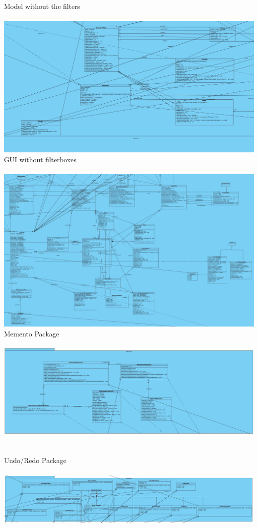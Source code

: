 \documentclass[twoside]{book}
\newcommand{\+}{\discretionary{\mbox{\scriptsize$\hookleftarrow$}}{}{}}
\begin{document}
\newpage
Model without the filters\\\\
{\centering\includegraphics[width=1\textwidth]{Model_noFilter.jpg}}\\
\newpage
GUI without filterboxes\\\\
{\centering\includegraphics[width=1\textwidth]{GUI_noFilter.jpg}}\\
\newpage
Memento Package\\\\
{\centering\includegraphics[width=1\textwidth]{Memento.jpg}}\\\\\\
Undo/Redo Package\\\\
{\centering\includegraphics[width=1\textwidth]{UndoRedo.jpg}}\\
\newpage
\end{document}
